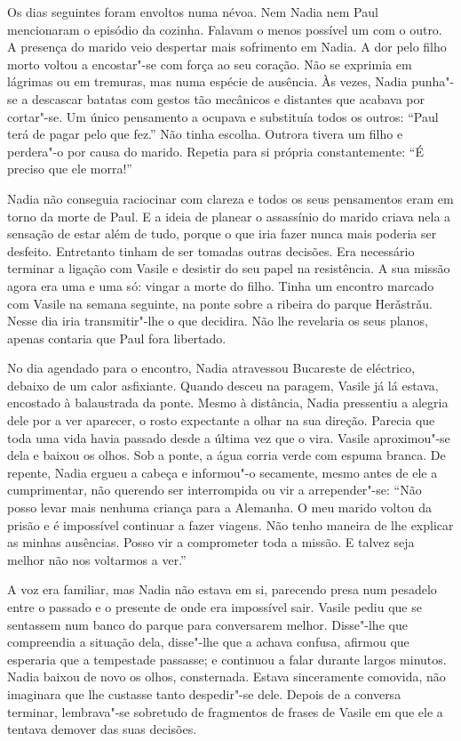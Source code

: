 Os dias seguintes foram envoltos numa névoa. Nem Nadia nem Paul
mencionaram o episódio da cozinha. Falavam o menos possível um com o
outro. A presença do marido veio despertar mais sofrimento em Nadia. A
dor pelo filho morto voltou a encostar"-se com força ao seu coração. Não
se exprimia em lágrimas ou em tremuras, mas numa espécie de ausência. Às
vezes, Nadia punha"-se a descascar batatas com gestos tão mecânicos e
distantes que acabava por cortar"-se. Um único pensamento a ocupava e
substituía todos os outros: ``Paul terá de pagar pelo que fez.'' Não tinha
escolha. Outrora tivera um filho e perdera"-o por causa do marido.
Repetia para si própria constantemente: ``É preciso que ele morra!''

Nadia não conseguia raciocinar com clareza e todos os seus pensamentos
eram em torno da morte de Paul. E a ideia de planear o assassínio do
marido criava nela a sensação de estar além de tudo, porque o que iria
fazer nunca mais poderia ser desfeito. Entretanto tinham de ser tomadas outras decisões. Era necessário terminar a ligação com Vasile e
desistir do seu papel na resistência. A sua missão agora era uma e uma
só: vingar a morte do filho. Tinha um encontro marcado com Vasile na
semana seguinte, na ponte sobre a ribeira do parque Herǎstrǎu. Nesse
dia iria transmitir"-lhe o que decidira. Não lhe revelaria os seus
planos, apenas contaria que Paul fora libertado.

\bigskip

No dia agendado para o encontro, Nadia atravessou Bucareste de
eléctrico, debaixo de um calor asfixiante. Quando desceu na paragem,
Vasile já lá estava, encostado à balaustrada da ponte. Mesmo à
distância, Nadia pressentiu a alegria dele por a ver aparecer, o rosto expectante a olhar na sua direção. Parecia que toda uma vida havia passado desde a última vez
que o vira. Vasile aproximou"-se dela e baixou os olhos. Sob a ponte, a
água corria verde com espuma branca. De repente, Nadia ergueu a cabeça e
informou"-o secamente, mesmo antes de ele a cumprimentar, não querendo
ser interrompida ou vir a arrepender"-se:
``Não posso levar mais nenhuma criança para a Alemanha. O meu marido
voltou da prisão e é impossível continuar a fazer viagens. Não tenho
maneira de lhe explicar as minhas ausências. Posso vir a comprometer
toda a missão. E talvez seja melhor não nos voltarmos a ver.''

A voz era familiar, mas Nadia não estava em si, parecendo presa num
pesadelo entre o passado e o presente de onde era impossível sair.
Vasile pediu que se sentassem num banco do parque para conversarem
melhor. Disse"-lhe que compreendia a situação dela, disse"-lhe que a
achava confusa, afirmou que esperaria que a tempestade passasse; e
continuou a falar durante largos minutos. Nadia baixou de novo os olhos,
consternada. Estava sinceramente comovida, não imaginara que lhe
custasse tanto despedir"-se dele. Depois de a conversa terminar,
lembrava"-se sobretudo de fragmentos de frases de Vasile em que ele a
tentava demover das suas decisões.


